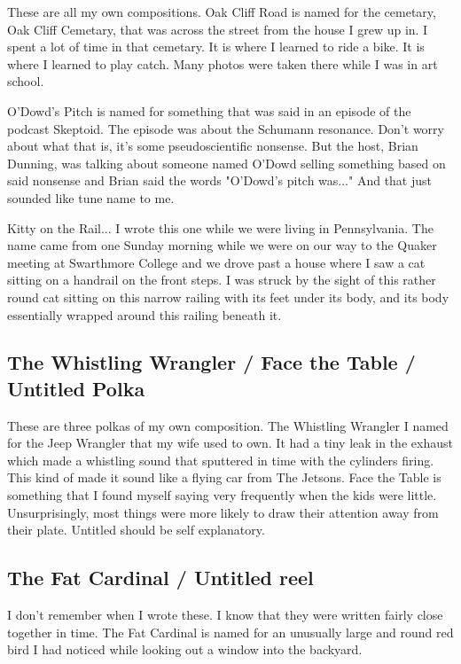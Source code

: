 \documentclass[9pt,letterpaper]{article}
\begin{document}
{These are all my own compositions. Oak Cliff Road is named for the cemetary, Oak Cliff Cemetary, that was across the street from the house I grew up in. I spent a lot of time in that cemetary. It is where I learned to ride a bike. It is where I learned to play catch. Many photos were taken there while I was in art school.

O'Dowd's Pitch is named for something that was said in an episode of the podcast Skeptoid. The episode was about the Schumann resonance. Don't worry about what that is, it's some pseudoscientific nonsense. But the host, Brian Dunning, was talking about someone named O'Dowd selling something based on said nonsense and Brian said the words "O'Dowd's pitch was..." And that just sounded like tune name to me.

Kitty on the Rail... I wrote this one while we were living in Pennsylvania. The name came from one Sunday morning while we were on our way to the Quaker meeting at Swarthmore College and we drove past a house where I saw a cat sitting on a handrail on the front steps. I was struck by the sight of this rather round cat sitting on this narrow railing with its feet under its body, and its body essentially wrapped around this railing beneath it.

\subsection{The Whistling Wrangler / Face the Table / Untitled Polka}

These are three polkas of my own composition. The Whistling Wrangler I named for the Jeep Wrangler that my wife used to own. It had a tiny leak in the exhaust which made a whistling sound that sputtered in time with the cylinders firing. This kind of made it sound like a flying car from The Jetsons. Face the Table is something that I found myself saying very frequently when the kids were little. Unsurprisingly, most things were more likely to draw their attention away from their plate. Untitled should be self explanatory.

\subsection{The Fat Cardinal / Untitled reel}

I don't remember when I wrote these. I know that they were written fairly close together in time. The Fat Cardinal is named for an unusually large and round red bird I had noticed while looking out a window into the backyard.

}
\end{document}
